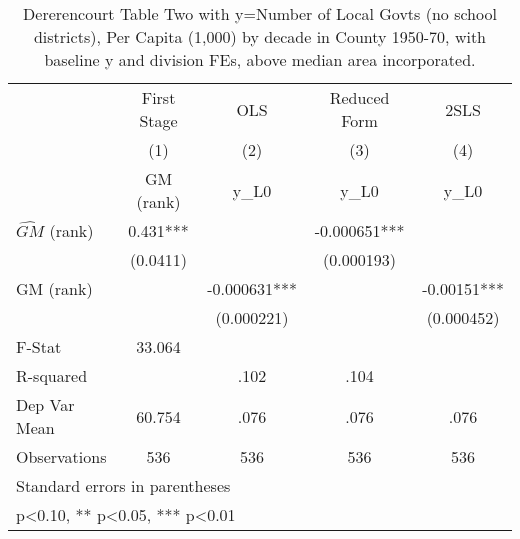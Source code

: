 \begin{table}[htbp]\centering
\def\sym#1{\ifmmode^{#1}\else\(^{#1}\)\fi}
\caption{Dererencourt Table Two with y=Number of Local Govts (no school districts), Per Capita (1,000) by decade in County 1950-70, with baseline y and division FEs, above median area incorporated.}
\begin{tabular}{l*{4}{c}}
\toprule
                    & First Stage   &         OLS   &Reduced Form   &        2SLS   \\
                    &\multicolumn{1}{c}{(1)}&\multicolumn{1}{c}{(2)}&\multicolumn{1}{c}{(3)}&\multicolumn{1}{c}{(4)}\\
                    &\multicolumn{1}{c}{GM  (rank)}&\multicolumn{1}{c}{y\_L0}&\multicolumn{1}{c}{y\_L0}&\multicolumn{1}{c}{y\_L0}\\
\midrule
$\hat{GM}$ (rank)   &       0.431***&               &   -0.000651***&               \\
                    &    (0.0411)   &               &  (0.000193)   &               \\
\addlinespace
GM  (rank)          &               &   -0.000631***&               &    -0.00151***\\
                    &               &  (0.000221)   &               &  (0.000452)   \\
\midrule
F-Stat              &      33.064   &               &               &               \\
R-squared           &               &        .102   &        .104   &               \\
Dep Var Mean        &      60.754   &        .076   &        .076   &        .076   \\
Observations        &         536   &         536   &         536   &         536   \\
\bottomrule
\multicolumn{5}{l}{\footnotesize Standard errors in parentheses}\\
\multicolumn{5}{l}{\footnotesize * p<0.10, ** p<0.05, *** p<0.01}\\
\end{tabular}
\end{table}
